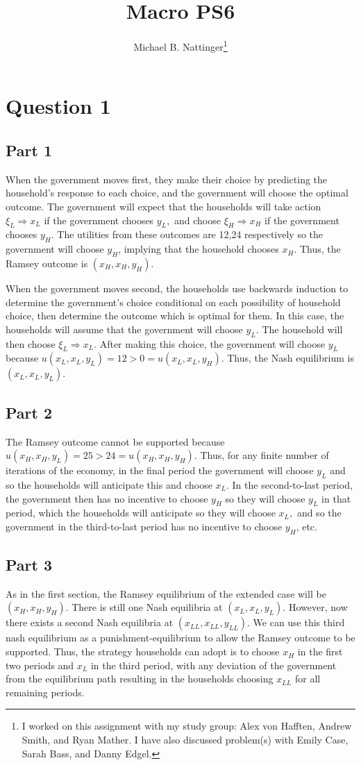 \documentclass[11pt]{article} %
\title{Macro PS6}
\author{Michael B. Nattinger\footnote{I worked on this assignment with my study group: Alex von Hafften, Andrew Smith, and Ryan Mather. I have also discussed problem(s) with Emily Case, Sarah Bass, and Danny Edgel.}}
\begin{document}
\maketitle

\section{Question 1}
\subsection{Part 1}
When the government moves first, they make their choice by predicting the household's response to each choice, and the government will choose the optimal outcome. The government will expect that the households will take action $\xi_L \Rightarrow x_L$ if the government chooses $y_L,$ and choose $\xi_H \Rightarrow x_H$ if the government chooses $y_H$. The utilities from these outcomes are 12,24 respectively so the government will choose $y_H$, implying that the household chooses $x_H$. Thus, the Ramsey outcome is $(x_H,x_H,y_H)$.

When the government moves second, the households use backwards induction to determine the government's choice conditional on each possibility of household choice, then determine the outcome which is optimal for them. In this case, the households will assume that the government will choose $y_L$. The household will then choose $\xi_L \Rightarrow x_L$. After making this choice, the government will choose $y_L$ because $u(x_L,x_L,y_L)=12>0 = u(x_L,x_L,y_H)$. Thus, the Nash equilibrium is $(x_L,x_L,y_L).$
\subsection{Part 2}
The Ramsey outcome cannot be supported because $u(x_H,x_H,y_L) = 25>24 = u(x_H,x_H,y_H)$. Thus, for any finite number of iterations of the economy, in the final period the government will choose $y_L$ and so the households will anticipate this and choose $x_L$. In the second-to-last period, the government then has no incentive to choose $y_H$ so they will choose $y_L$ in that period, which the households will anticipate so they will choose $x_L,$ and so the government in the third-to-last period has no incentive to choose $y_H$, etc.
\subsection{Part 3}
As in the first section, the Ramsey equilibrium of the extended case will be $(x_H,x_H,y_H)$. There is still one Nash equilibria at $(x_L,x_L,y_L).$ However, now there exists a second Nash equilibria at $(x_{LL},x_{LL},y_{LL}).$ We can use this third nash equilibrium as a punishment-equilibrium to allow the Ramsey outcome to be supported. Thus, the strategy households can adopt is to choose $x_H$ in the first two periods and $x_L$ in the third period, with any deviation of the government from the equilibrium path resulting in the households choosing $x_{LL}$ for all remaining periods.
\end{document}
